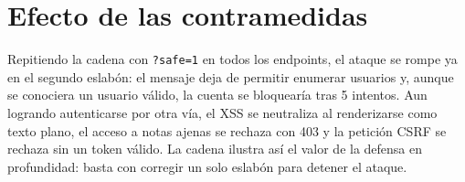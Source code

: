 \section{Efecto de las contramedidas}

Repitiendo la cadena con \texttt{?safe=1} en todos los endpoints, el ataque
se rompe ya en el segundo eslabón: el mensaje deja de permitir enumerar
usuarios y, aunque se conociera un usuario válido, la cuenta se bloquearía
tras 5 intentos. Aun logrando autenticarse por otra vía, el XSS se
neutraliza al renderizarse como texto plano, el acceso a notas ajenas se
rechaza con 403 y la petición CSRF se rechaza sin un token válido. La
cadena ilustra así el valor de la defensa en profundidad: basta con
corregir un solo eslabón para detener el ataque.
